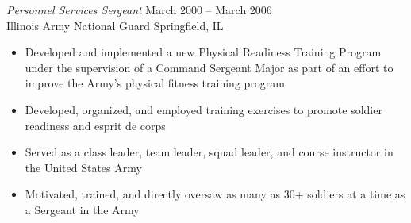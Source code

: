 \documentclass[margin,line]{resume}
\begin{document}
\begin{resume}
{\sl Personnel Services Sergeant}   \hfill   March 2000 -- March 2006\\
Illinois Army National Guard        \hfill   Springfield, IL
\begin{itemize} \itemsep -2pt %
\small\item Developed and implemented a new Physical Readiness Training Program under the supervision of a
            Command Sergeant Major as part of an effort to improve the Army's physical fitness training program
\small\item Developed, organized, and employed training exercises to promote soldier readiness and esprit de corps
\small\item Served as a class leader, team leader, squad leader, and course instructor in the United States Army
\small\item Motivated, trained, and directly oversaw as many as 30+ soldiers at a time as a Sergeant in the Army
\end{itemize}


\end{resume}
\end{document}
